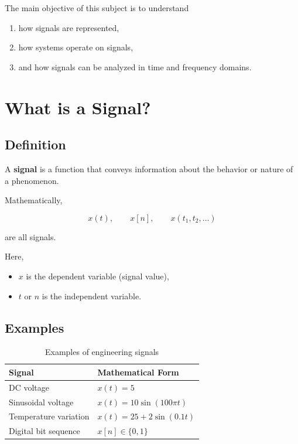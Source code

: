 The main objective of this subject is to understand

\begin{enumerate}
\item how signals are represented,
\item how systems operate on signals,
\item and how signals can be analyzed in time and frequency domains.
\end{enumerate}


\section{What is a Signal?}

\subsection{Definition}

A \textbf{signal} is a function that conveys information about the behavior or
nature of a phenomenon.

Mathematically,

\[
x(t),\qquad x[n],\qquad x(t_1,t_2,\ldots)
\]

are all signals.

Here,

\begin{itemize}
\item \(x\) is the dependent variable (signal value),
\item \(t\) or \(n\) is the independent variable.
\end{itemize}


\subsection{Examples}

\begin{table}[H]
\centering
\caption{Examples of engineering signals}
\begin{tabular}{|p{5cm}|p{6cm}|}
\hline
\textbf{Signal} & \textbf{Mathematical Form} \\
\hline
DC voltage & \(x(t)=5\) \\
\hline
Sinusoidal voltage & \(x(t)=10\sin(100\pi t)\) \\
\hline
Temperature variation & \(x(t)=25+2\sin(0.1t)\) \\
\hline
Digital bit sequence & \(x[n]\in\{0,1\}\) \\
\hline
\end{tabular}
\end{table}

